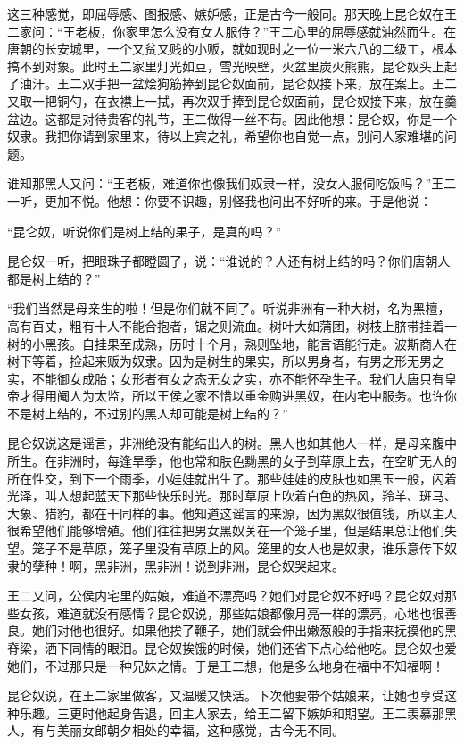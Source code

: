 这三种感觉，即屈辱感、图报感、嫉妒感，正是古今一般同。那天晚上昆仑奴在王二家问：“王老板，你家里怎么没有女人服侍？”王二心里的屈辱感就油然而生。在唐朝的长安城里，一个又贫又贱的小贩，就如现时之一位一米六八的二级工，根本搞不到对象。此时王二家里灯光如豆，雪光映壁，火盆里炭火熊熊，昆仑奴头上起了油汗。王二双手把一盆烩狗筋捧到昆仑奴面前，昆仑奴接下来，放在案上。王二又取一把铜勺，在衣襟上一拭，再次双手捧到昆仑奴面前，昆仑奴接下来，放在羹盆边。这都是对待贵客的礼节，王二做得一丝不苟。因此他想：昆仑奴，你是一个奴隶。我把你请到家里来，待以上宾之礼，希望你也自觉一点，别问人家难堪的问题。 

谁知那黑人又问：“王老板，难道你也像我们奴隶一样，没女人服伺吃饭吗？”王二一听，更加不悦。他想：你要不识趣，别怪我也问出不好听的来。于是他说： 

“昆仑奴，听说你们是树上结的果子，是真的吗？” 

昆仑奴一听，把眼珠子都瞪圆了，说：“谁说的？人还有树上结的吗？你们唐朝人都是树上结的？” 

“我们当然是母亲生的啦！但是你们就不同了。听说非洲有一种大树，名为黑檀，高有百丈，粗有十人不能合抱者，锯之则流血。树叶大如蒲团，树枝上脐带挂着一树的小黑孩。自挂果至成熟，历时十个月，熟则坠地，能言语能行走。波斯商人在树下等着，捡起来贩为奴隶。因为是树生的果实，所以男身者，有男之形无男之实，不能御女成胎；女形者有女之态无女之实，亦不能怀孕生子。我们大唐只有皇帝才得用阉人为太监，所以王侯之家不惜以重金购进黑奴，在内宅中服务。也许你不是树上结的，不过别的黑人却可能是树上结的？” 

昆仑奴说这是谣言，非洲绝没有能结出人的树。黑人也如其他人一样，是母亲腹中所生。在非洲时，每逢旱季，他也常和肤色黝黑的女子到草原上去，在空旷无人的所在性交，到下一个雨季，小娃娃就出生了。那些娃娃的皮肤也如黑玉一般，闪着光泽，叫人想起蓝天下那些快乐时光。那时草原上吹着白色的热风，羚羊、斑马、大象、猎豹，都在干同样的事。他知道这谣言的来源，因为黑奴很值钱，所以主人很希望他们能够增殖。他们往往把男女黑奴关在一个笼子里，但是结果总让他们失望。笼子不是草原，笼子里没有草原上的风。笼里的女人也是奴隶，谁乐意传下奴隶的孽种！啊，黑非洲，黑非洲！说到非洲，昆仑奴哭起来。 

王二又问，公侯内宅里的姑娘，难道不漂亮吗？她们对昆仑奴不好吗？昆仑奴对那些女孩，难道就没有感情？昆仑奴说，那些姑娘都像月亮一样的漂亮，心地也很善良。她们对他也很好。如果他挨了鞭子，她们就会伸出嫩葱般的手指来抚摸他的黑脊梁，洒下同情的眼泪。昆仑奴挨饿的时候，她们还省下点心给他吃。昆仑奴也爱她们，不过那只是一种兄妹之情。于是王二想，他是多么地身在福中不知福啊！ 

昆仑奴说，在王二家里做客，又温暖又快活。下次他要带个姑娘来，让她也享受这种乐趣。三更时他起身告退，回主人家去，给王二留下嫉妒和期望。王二羡慕那黑人，有与美丽女郎朝夕相处的幸福，这种感觉，古今无不同。 

